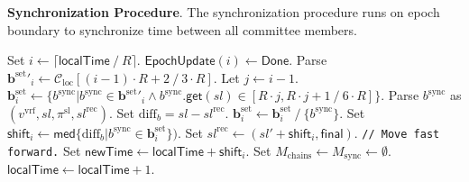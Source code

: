 \bigbreak
\bigbreak
\noindent
{}
\textbf{Synchronization Procedure}.\label{apndx:sync-proc}
The synchronization procedure runs on epoch boundary to synchronize time between all committee members.
\begin{protocol}
    \caption{$\textsf{SyncProc}(P, \text{sid}, R, K_{\text{f}}, K_{\text{g}},
    \mathbf{S}_{\text{id}} = \{S_k^{\text{id}}\}_{k=1}^K,
    \mathbf{f}_{\text{lead}} =  \{f^{\text{lead}}_k\}_{k=1}^K,
    \mathbf{f}_{\text{cons}} = \{f^{\text{cons}}_k\}_{k=1}^K)$}
    \begin{algorithmic}[1]
        \State Set $i \leftarrow \lceil \textsf{localTime} \mathbin{/} R \rceil$.
            \State $\textsf{EpochUpdate}(i) \leftarrow \textsf{Done}$.
            \State Parse $\mathbf{b}^{\text{set}}'_i \leftarrow \mathcal{C}_{\text{loc}}[(i - 1) \cdot R + 2 \mathbin{/} 3 \cdot R]$.
            \State Let $j \leftarrow i - 1$.
            \State ${\mathbf{b}^{\text{set}}_i \leftarrow \{b^{\text{sync}} | b^{\text{sync}} \in
            \mathbf{b}^{\text{set}}'_i \wedge b^{\text{sync}}\textsf{.get}(sl) \in [R \cdot j,
            R \cdot j + 1 \mathbin{/} 6 \cdot R]\}}$.
                    \State Parse $b^{\text{sync}}$ as $(v^{\text{vrf}}, sl, \pi^{\text{sl}}, sl^{\text{rec}})$.
                    \State Set $\text{diff}_b = sl - sl^{\text{rec}}$.
                \Else
                    \State $\mathbf{b}^{\text{set}}_i \leftarrow \mathbf{b}^{\text{set}}_i \mathbin{/} \{b^{\text{sync}}\}$.
                \EndIf
            \EndFor
            \State Set $\textsf{shift}_i \leftarrow \textsf{med}\{\text{diff}_b | b^{\text{sync}} \in \mathbf{b}^{\text{set}}_i\})$.
                \State Set $sl^{\text{rec}} \leftarrow (sl' + \textsf{shift}_i, \textsf{final})$.
            \EndFor
                \lstinline|// Move fast forward.|
                \State Set $\textsf{newTime} \leftarrow \textsf{localTime} + \textsf{shift}_i$.
                \State Set $M_\text{chains} \leftarrow M_\text{sync} \leftarrow \emptyset$.
                    \State $\textsf{localTime} \leftarrow \textsf{localTime} + 1$.

\end{algorithmic}
\end{protocol}
